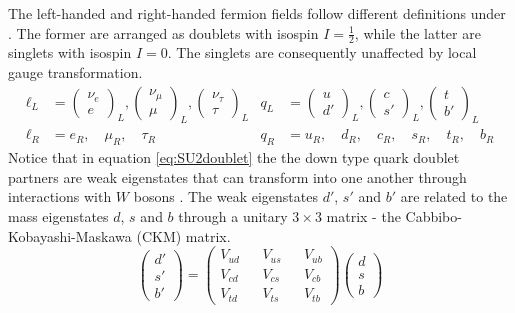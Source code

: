 The left-handed and right-handed fermion fields follow different definitions under . The former are arranged as doublets with isospin $I=\frac{1}{2}$, while the latter are singlets with isospin $I=0$. The singlets are consequently unaffected by  local gauge transformation.
\begin{align}\label{eq:SU2doublet}
    \ell_L & =
    \begin{pmatrix}
        \nu_e\\
        e
    \end{pmatrix}_L,
        \begin{pmatrix}
        \nu_{\mu}\\
        \mu
    \end{pmatrix}_L,
        \begin{pmatrix}
        \nu_{\tau}\\
        \tau
    \end{pmatrix}_L
    & q_L & =
    \begin{pmatrix}
        u\\
        d'
    \end{pmatrix}_L,
    \begin{pmatrix}
        c\\
        s'
    \end{pmatrix}_L,
    \begin{pmatrix}
        t\\
        b'
    \end{pmatrix}_L\\
    \ell_R & =e_R, \quad \mu_R, \quad \tau_R
    \qquad 
    & q_R & = u_R, \quad d_R, \quad c_R, \quad s_R, \quad t_R, \quad b_R
\end{align}
Notice that in equation \ref{eq:SU2doublet} the the down type quark doublet partners are weak eigenstates that can transform into one another through interactions with $W$ bosons \cite{Raby:1997bp}. The weak eigenstates $d'$, $s'$ and $b'$ are related to the mass eigenstates $d$, $s$ and $b$ through a unitary $3\times3$ matrix - the Cabbibo-Kobayashi-Maskawa (CKM) matrix. 
\begin{equation}
    \begin{pmatrix}
        d'\\
        s'\\
        b'
    \end{pmatrix}
    =
    \begin{pmatrix} 
        V_{ud} && V_{us} && V_{ub}\\ 
        V_{cd} && V_{cs} && V_{cb}\\
        V_{td} && V_{ts} && V_{tb}
    \end{pmatrix}
        \begin{pmatrix}
        d\\
        s\\
        b
    \end{pmatrix}
\end{equation}

